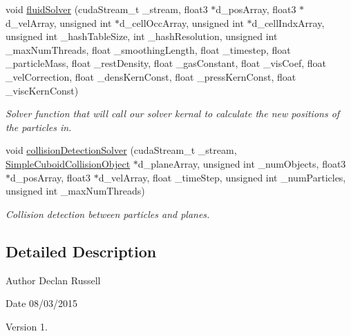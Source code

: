 \begin{DoxyCompactItemize}
void \hyperlink{_cuda_s_p_h_kernals_8cu_a59c1e6aa2f1fb9792cde8f2ab4eba1d5}{fluid\-Solver} (cuda\-Stream\-\_\-t \-\_\-stream, float3 $\ast$d\-\_\-pos\-Array, float3 $\ast$d\-\_\-vel\-Array, unsigned int $\ast$d\-\_\-cell\-Occ\-Array, unsigned int $\ast$d\-\_\-cell\-Indx\-Array, unsigned int \-\_\-hash\-Table\-Size, int \-\_\-hash\-Resolution, unsigned int \-\_\-max\-Num\-Threads, float \-\_\-smoothing\-Length, float \-\_\-timestep, float \-\_\-particle\-Mass, float \-\_\-rest\-Density, float \-\_\-gas\-Constant, float \-\_\-vis\-Coef, float \-\_\-vel\-Correction, float \-\_\-dens\-Kern\-Const, float \-\_\-press\-Kern\-Const, float \-\_\-visc\-Kern\-Const)
\begin{DoxyCompactList}\small\item\em Solver function that will call our solver kernal to calculate the new positions of the particles in. \end{DoxyCompactList}\item 
void \hyperlink{_cuda_s_p_h_kernals_8cu_a1985239f9afd133a3db010848f3950f6}{collision\-Detection\-Solver} (cuda\-Stream\-\_\-t \-\_\-stream, \hyperlink{struct_simple_cuboid_collision_object}{Simple\-Cuboid\-Collision\-Object} $\ast$d\-\_\-plane\-Array, unsigned int \-\_\-num\-Objects, float3 $\ast$d\-\_\-pos\-Array, float3 $\ast$d\-\_\-vel\-Array, float \-\_\-time\-Step, unsigned int \-\_\-num\-Particles, unsigned int \-\_\-max\-Num\-Threads)
\begin{DoxyCompactList}\small\item\em Collision detection between particles and planes. \end{DoxyCompactList}\end{DoxyCompactItemize}


\subsection{Detailed Description}
\begin{DoxyAuthor}{Author}
Declan Russell 
\end{DoxyAuthor}
\begin{DoxyDate}{Date}
08/03/2015 
\end{DoxyDate}
\begin{DoxyVersion}{Version}
1. 
\end{DoxyVersion}


